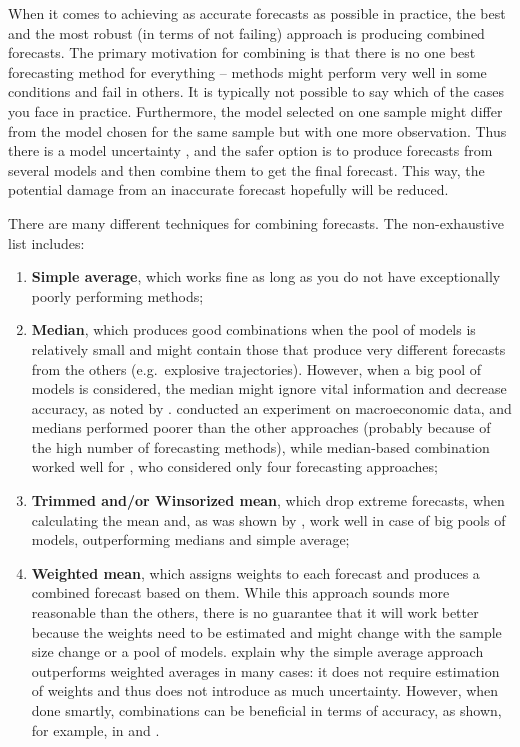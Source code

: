 \documentclass[
]{book}
\providecommand{\tightlist}{%
  \setlength{\itemsep}{0pt}\setlength{\parskip}{0pt}}
\theoremstyle{definition}
\theoremstyle{definition}
\theoremstyle{definition}
\theoremstyle{definition}
\theoremstyle{remark}
\begin{document}
When it comes to achieving as accurate forecasts as possible in practice, the best and the most robust (in terms of not failing) approach is producing combined forecasts. The primary motivation for combining is that there is no one best forecasting method for everything -- methods might perform very well in some conditions and fail in others. It is typically not possible to say which of the cases you face in practice. Furthermore, the model selected on one sample might differ from the model chosen for the same sample but with one more observation. Thus there is a model uncertainty \citep[as defined by][]{Chatfield1996}, and the safer option is to produce forecasts from several models and then combine them to get the final forecast. This way, the potential damage from an inaccurate forecast hopefully will be reduced.

There are many different techniques for combining forecasts. The non-exhaustive list includes:

\begin{enumerate}
\def\labelenumi{\arabic{enumi}.}
\tightlist
\item
  \textbf{Simple average}, which works fine as long as you do not have exceptionally poorly performing methods;
\item
  \textbf{Median}, which produces good combinations when the pool of models is relatively small and might contain those that produce very different forecasts from the others (e.g.~explosive trajectories). However, when a big pool of models is considered, the median might ignore vital information and decrease accuracy, as noted by \citet{Jose2008}. \citet{Stock2004} conducted an experiment on macroeconomic data, and medians performed poorer than the other approaches (probably because of the high number of forecasting methods), while median-based combination worked well for \citet{Petropoulos2020}, who considered only four forecasting approaches;
\item
  \textbf{Trimmed and/or Winsorized mean}, which drop extreme forecasts, when calculating the mean and, as was shown by \citet{Jose2008}, work well in case of big pools of models, outperforming medians and simple average;
\item
  \textbf{Weighted mean}, which assigns weights to each forecast and produces a combined forecast based on them. While this approach sounds more reasonable than the others, there is no guarantee that it will work better because the weights need to be estimated and might change with the sample size change or a pool of models. \citet{Claeskens2016} explain why the simple average approach outperforms weighted averages in many cases: it does not require estimation of weights and thus does not introduce as much uncertainty. However, when done smartly, combinations can be beneficial in terms of accuracy, as shown, for example, in \citet{Kolassa2011} and \citet{Kourentzes2019c}.
\end{enumerate}
\end{document}

